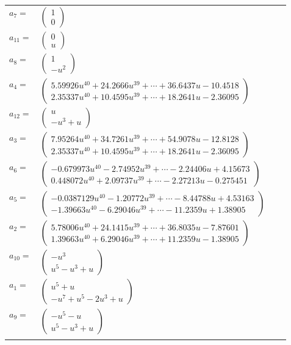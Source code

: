 \documentclass[1p]{elsarticle_modified}
\theoremstyle{definition}
\begin{document}
\begin{tabular}{m{7pt} m{180pt} m{7pt} m{180pt} }
\flushright $a_{7}=$&$\begin{pmatrix}1\\0\end{pmatrix}$ \\
\flushright $a_{11}=$&$\begin{pmatrix}0\\u\end{pmatrix}$ \\
\flushright $a_{8}=$&$\begin{pmatrix}1\\- u^2\end{pmatrix}$ \\
\flushright $a_{4}=$&$\begin{pmatrix}5.59926 u^{40}+24.2666 u^{39}+\cdots+36.6437 u-10.4518\\2.35337 u^{40}+10.4595 u^{39}+\cdots+18.2641 u-2.36095\end{pmatrix}$ \\
\flushright $a_{12}=$&$\begin{pmatrix}u\\- u^3+u\end{pmatrix}$ \\
\flushright $a_{3}=$&$\begin{pmatrix}7.95264 u^{40}+34.7261 u^{39}+\cdots+54.9078 u-12.8128\\2.35337 u^{40}+10.4595 u^{39}+\cdots+18.2641 u-2.36095\end{pmatrix}$ \\
\flushright $a_{6}=$&$\begin{pmatrix}-0.679973 u^{40}-2.74952 u^{39}+\cdots-2.24406 u+4.15673\\0.448072 u^{40}+2.09737 u^{39}+\cdots-2.27213 u-0.275451\end{pmatrix}$ \\
\flushright $a_{5}=$&$\begin{pmatrix}-0.0387129 u^{40}-1.20772 u^{39}+\cdots-8.44788 u+4.53163\\-1.39663 u^{40}-6.29046 u^{39}+\cdots-11.2359 u+1.38905\end{pmatrix}$ \\
\flushright $a_{2}=$&$\begin{pmatrix}5.78006 u^{40}+24.1415 u^{39}+\cdots+36.8035 u-7.87601\\1.39663 u^{40}+6.29046 u^{39}+\cdots+11.2359 u-1.38905\end{pmatrix}$ \\
\flushright $a_{10}=$&$\begin{pmatrix}- u^3\\u^5- u^3+u\end{pmatrix}$ \\
\flushright $a_{1}=$&$\begin{pmatrix}u^5+u\\- u^7+u^5-2 u^3+u\end{pmatrix}$ \\
\flushright $a_{9}=$&$\begin{pmatrix}- u^5- u\\u^5- u^3+u\end{pmatrix}$\\&\end{tabular}
\end{document}
